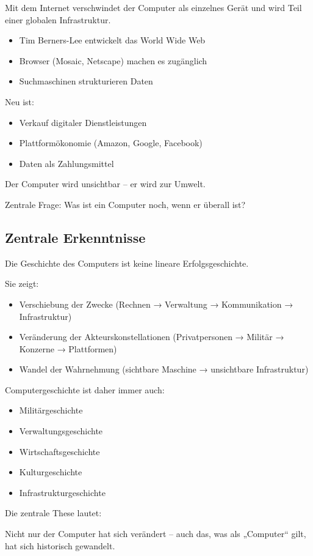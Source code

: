 Mit dem Internet verschwindet der Computer als einzelnes Gerät 
und wird Teil einer globalen Infrastruktur.

\begin{itemize}
    \item Tim Berners-Lee entwickelt das World Wide Web
    \item Browser (Mosaic, Netscape) machen es zugänglich
    \item Suchmaschinen strukturieren Daten
\end{itemize}

Neu ist:

\begin{itemize}
    \item Verkauf digitaler Dienstleistungen
    \item Plattformökonomie (Amazon, Google, Facebook)
    \item Daten als Zahlungsmittel
\end{itemize}

Der Computer wird unsichtbar – er wird zur Umwelt.

Zentrale Frage:
Was ist ein Computer noch, wenn er überall ist?

\subsection{Zentrale Erkenntnisse}

Die Geschichte des Computers ist keine lineare Erfolgsgeschichte.

Sie zeigt:

\begin{itemize}
    \item Verschiebung der Zwecke (Rechnen → Verwaltung → Kommunikation → Infrastruktur)
    \item Veränderung der Akteurskonstellationen (Privatpersonen → Militär → Konzerne → Plattformen)
    \item Wandel der Wahrnehmung (sichtbare Maschine → unsichtbare Infrastruktur)
\end{itemize}

Computergeschichte ist daher immer auch:

\begin{itemize}
    \item Militärgeschichte
    \item Verwaltungsgeschichte
    \item Wirtschaftsgeschichte
    \item Kulturgeschichte
    \item Infrastrukturgeschichte
\end{itemize}

Die zentrale These lautet:

Nicht nur der Computer hat sich verändert – 
auch das, was als „Computer“ gilt, hat sich historisch gewandelt.
